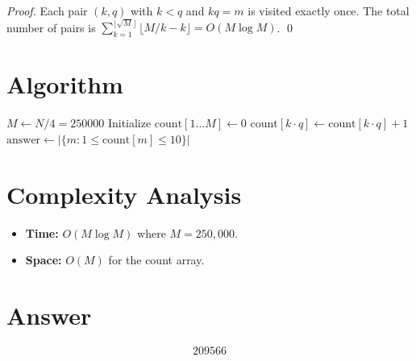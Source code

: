 \documentclass[11pt]{article}
\begin{document}
\begin{proof}
Each pair $(k, q)$ with $k < q$ and $kq = m$ is visited exactly once. The total number of pairs is $\sum_{k=1}^{\lfloor\sqrt{M}\rfloor} \lfloor M/k - k \rfloor = O(M \log M)$. \qed
\end{proof}

\section{Algorithm}

\begin{algorithmic}[1]
\State $M \gets N/4 = 250000$
\State Initialize $\text{count}[1 \ldots M] \gets 0$
        \State $\text{count}[k \cdot q] \gets \text{count}[k \cdot q] + 1$
    \EndFor
\EndFor
\State $\text{answer} \gets |\{m : 1 \leq \text{count}[m] \leq 10\}|$
\end{algorithmic}

\section{Complexity Analysis}

\begin{itemize}
    \item \textbf{Time:} $O(M \log M)$ where $M = 250{,}000$.
    \item \textbf{Space:} $O(M)$ for the count array.
\end{itemize}

\section{Answer}

\[
\boxed{209566}
\]
\end{document}

